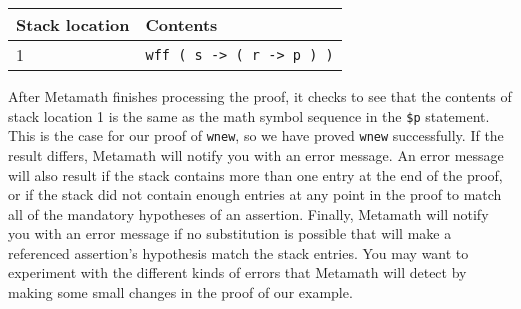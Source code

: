 \begin{center}\begin{tabular}{|l|l|}\hline
{Stack location} & {Contents} \\ \hline \hline
1 & \texttt{wff ( s -> ( r -> p ) )} \\ \hline
\end{tabular}\end{center}

After Metamath finishes processing the proof, it checks to see that the
contents of stack location 1 is the same as the math symbol sequence in the
\texttt{\$p} statement.  This is the case for our
proof of \texttt{wnew}, so we have proved \texttt{wnew} successfully.  If the result
differs, Metamath will notify you with an error message.  An error message
will also result if the stack contains more than one entry at the end of the
proof, or if the stack did not contain enough entries at any point in the
proof to match all of the mandatory hypotheses of
an assertion.  Finally, Metamath will notify you with an error message if no
substitution is possible that will make a referenced assertion's hypothesis
match the
stack entries.  You may want to experiment with the different kinds of errors
that Metamath will detect by making some small changes in the proof of our
example.

